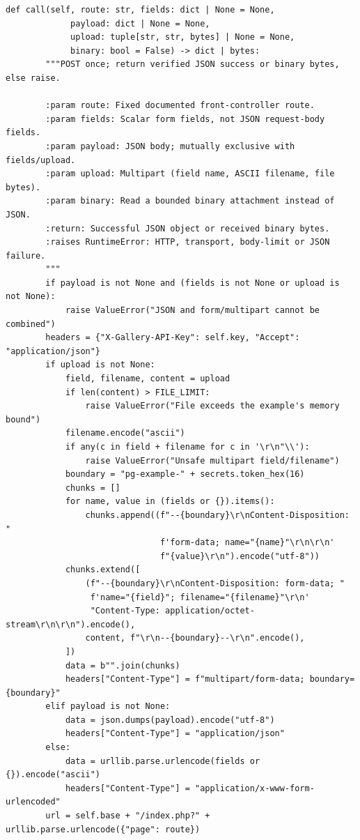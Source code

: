 \documentclass[11pt,a4paper]{article}
\begin{document}
\begin{lstlisting}[language={}]
    def call(self, route: str, fields: dict | None = None,
             payload: dict | None = None,
             upload: tuple[str, str, bytes] | None = None,
             binary: bool = False) -> dict | bytes:
        """POST once; return verified JSON success or binary bytes, else raise.

        :param route: Fixed documented front-controller route.
        :param fields: Scalar form fields, not JSON request-body fields.
        :param payload: JSON body; mutually exclusive with fields/upload.
        :param upload: Multipart (field name, ASCII filename, file bytes).
        :param binary: Read a bounded binary attachment instead of JSON.
        :return: Successful JSON object or received binary bytes.
        :raises RuntimeError: HTTP, transport, body-limit or JSON failure.
        """
        if payload is not None and (fields is not None or upload is not None):
            raise ValueError("JSON and form/multipart cannot be combined")
        headers = {"X-Gallery-API-Key": self.key, "Accept": "application/json"}
        if upload is not None:
            field, filename, content = upload
            if len(content) > FILE_LIMIT:
                raise ValueError("File exceeds the example's memory bound")
            filename.encode("ascii")
            if any(c in field + filename for c in '\r\n"\\'):
                raise ValueError("Unsafe multipart field/filename")
            boundary = "pg-example-" + secrets.token_hex(16)
            chunks = []
            for name, value in (fields or {}).items():
                chunks.append((f"--{boundary}\r\nContent-Disposition: "
                               f'form-data; name="{name}"\r\n\r\n'
                               f"{value}\r\n").encode("utf-8"))
            chunks.extend([
                (f"--{boundary}\r\nContent-Disposition: form-data; "
                 f'name="{field}"; filename="{filename}"\r\n'
                 "Content-Type: application/octet-stream\r\n\r\n").encode(),
                content, f"\r\n--{boundary}--\r\n".encode(),
            ])
            data = b"".join(chunks)
            headers["Content-Type"] = f"multipart/form-data; boundary={boundary}"
        elif payload is not None:
            data = json.dumps(payload).encode("utf-8")
            headers["Content-Type"] = "application/json"
        else:
            data = urllib.parse.urlencode(fields or {}).encode("ascii")
            headers["Content-Type"] = "application/x-www-form-urlencoded"
        url = self.base + "/index.php?" + urllib.parse.urlencode({"page": route})

\end{lstlisting}
\end{document}
